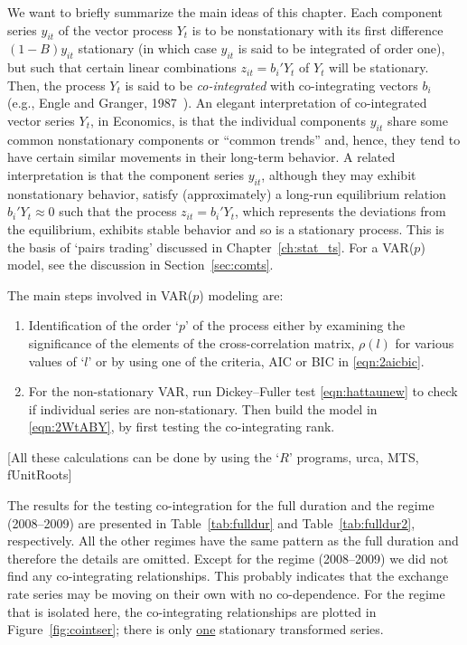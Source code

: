 We want to briefly summarize the main ideas of this chapter. Each component series $y_{it}$ of the vector process $Y_t$ is to be nonstationary with its first difference $(1 - B) y_{it}$ stationary (in which case $y_{it}$ is said to be integrated of order one), but such that certain linear combinations $z_{it} = b_i' Y_t $ of $Y_t$ will be stationary. Then, the process $Y_t$ is said to be \emph{co-integrated} with co-integrating vectors $b_i$ (e.g., Engle and Granger, 1987~\cite{engle1987co}). An elegant interpretation of co-integrated vector series $Y_t$, in Economics, is that the individual components $y_{it}$ share some common nonstationary components or ``common trends'' and, hence, they tend to have certain similar movements in their long-term behavior. A related interpretation is that the component series $y_{it}$, although they may exhibit nonstationary behavior, satisfy (approximately) a long-run equilibrium relation $b_i' Y_t \approx 0$ such that the process $z_{it} = b_i' Y_t$, which represents the deviations from the equilibrium, exhibits stable behavior and so is a stationary process. This is the basis of `pairs trading' discussed in Chapter~\ref{ch:stat_ts}. For a VAR($p$) model, see the discussion in Section~\ref{sec:comts}.


The main steps involved in VAR($p$) modeling are:
	\begin{enumerate}[--]
	\item Identification of the order `$p$' of the process either by examining the significance of the elements of the cross-correlation matrix, $\rho(l)$ for various values of `$l$' or by using one of the criteria, AIC or BIC in \eqref{eqn:2aicbic}.
	\item For the non-stationary VAR, run Dickey--Fuller test \eqref{eqn:hattaunew} to check if individual series are non-stationary. Then build the model in \eqref{eqn:2WtABY}, by first testing the co-integrating rank. 
	\end{enumerate}
[All these calculations can be done by using the `$R$' programs, urca, MTS, fUnitRoots]


The results for the testing co-integration for the full duration and the regime (2008--2009) are presented in Table~\ref{tab:fulldur} and Table~\ref{tab:fulldur2}, respectively. All the other regimes have the same pattern as the full duration and therefore the details are omitted. Except for the regime (2008--2009) we did not find any co-integrating relationships. This probably indicates that the exchange rate series may be moving on their own with no co-dependence. For the regime that is isolated here, the co-integrating relationships are plotted in Figure~\ref{fig:cointser}; there is only \underline{one} stationary transformed series.


